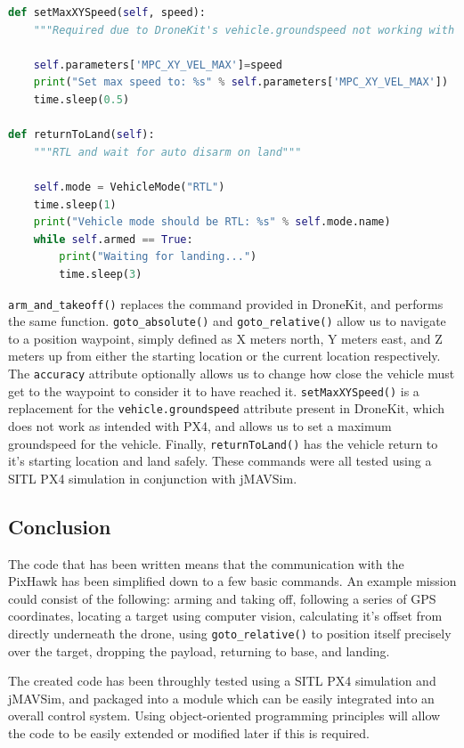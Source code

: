 \documentclass[11pt,twoside]{article}
\begin{document}
\begin{lstlisting}[language=Python]
def setMaxXYSpeed(self, speed):
    """Required due to DroneKit's vehicle.groundspeed not working with PX4"""

    self.parameters['MPC_XY_VEL_MAX']=speed
    print("Set max speed to: %s" % self.parameters['MPC_XY_VEL_MAX'])
    time.sleep(0.5)

def returnToLand(self):
    """RTL and wait for auto disarm on land"""

    self.mode = VehicleMode("RTL")
    time.sleep(1)
    print("Vehicle mode should be RTL: %s" % self.mode.name)
    while self.armed == True:
        print("Waiting for landing...")
        time.sleep(3)
\end{lstlisting}

\lstinline|arm_and_takeoff()| replaces the command provided in DroneKit, and performs the same function. \lstinline|goto_absolute()| and \lstinline|goto_relative()| allow us to navigate to a position waypoint, simply defined as X meters north, Y meters east, and Z meters up from either the starting location or the current location respectively. The \lstinline|accuracy| attribute optionally allows us to change how close the vehicle must get to the waypoint to consider it to have reached it. \lstinline|setMaxXYSpeed()| is a replacement for the \lstinline|vehicle.groundspeed| attribute present in DroneKit, which does not work as intended with PX4, and allows us to set a maximum groundspeed for the vehicle. Finally, \lstinline|returnToLand()| has the vehicle return to it's starting location and land safely. These commands were all tested using a SITL PX4 simulation in conjunction with jMAVSim.

\subsection{Conclusion}
The code that has been written means that the communication with the PixHawk has been simplified down to a few basic commands. An example mission could consist of the following: arming and taking off, following a series of GPS coordinates, locating a target using computer vision, calculating it's offset from directly underneath the drone, using \lstinline|goto_relative()| to position itself precisely over the target, dropping the payload, returning to base, and landing.

The created code has been throughly tested using a SITL PX4 simulation and jMAVSim, and packaged into a module which can be easily integrated into an overall control system. Using object-oriented programming principles will allow the code to be easily extended or modified later if this is required.
\end{document}
